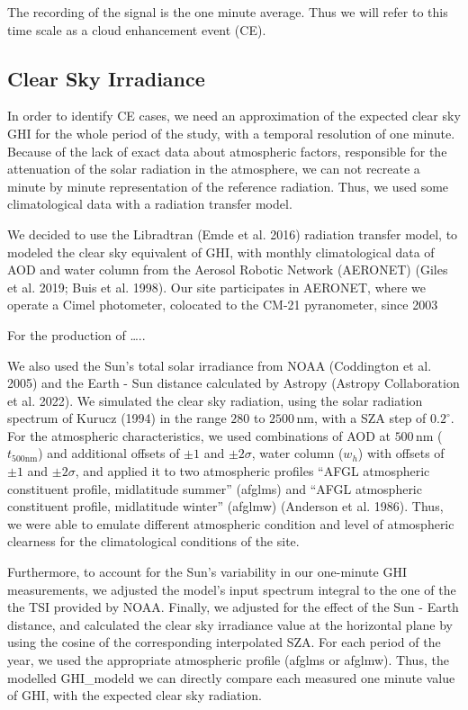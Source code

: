 \documentclass[
]{article}
\begin{document}
The recording of the signal is the one minute average.
Thus we will refer to this time scale as a cloud enhancement event (CE).

\hypertarget{clear-sky-irradiance}{%
\subsection{Clear Sky Irradiance}\label{clear-sky-irradiance}}

In order to identify CE cases, we need an approximation of the expected clear sky GHI
for the whole period of the study, with a temporal resolution of one minute. Because
of the lack of exact data about atmospheric factors, responsible for the attenuation
of the solar radiation in the atmosphere, we can not recreate a minute by minute
representation of the reference radiation. Thus, we used some climatological data
with a radiation transfer model.

We decided to use the Libradtran (Emde et al. 2016) radiation transfer model, to modeled
the clear sky equivalent of GHI, with monthly climatological data of AOD and water
column from the Aerosol Robotic Network (AERONET) (Giles et al. 2019; Buis et al. 1998). Our site
participates in AERONET, where we operate a Cimel photometer, colocated to
the CM-21 pyranometer, since 2003

For the production of \ldots..

We also used the Sun's total solar irradiance from NOAA (Coddington et al. 2005) and the
Earth - Sun distance calculated by Astropy (Astropy Collaboration et al. 2022). We simulated
the clear sky radiation, using the solar radiation spectrum of Kurucz (1994) in the
range \(280\) to \(2500\,\text{nm}\), with a SZA step of \(0.2^\circ\). For the
atmospheric characteristics, we used combinations of AOD at \(500\,\text{nm}\)
(\(t_{500\text{nm}}\)) and additional offsets of \(\pm1\) and \(\pm2\sigma\), water column
(\(w_h\)) with offsets of \(\pm1\) and \(\pm2\sigma\), and applied it to two atmospheric
profiles ``AFGL atmospheric constituent profile, midlatitude summer'' (afglms) and
``AFGL atmospheric constituent profile, midlatitude winter'' (afglmw) (Anderson et al. 1986).
Thus, we were able to emulate different atmospheric condition and level of
atmospheric clearness for the climatological conditions of the site.

Furthermore, to account for the Sun's variability in our one-minute GHI measurements,
we adjusted the model's input spectrum integral to the one of the the TSI provided by
NOAA. Finally, we adjusted for the effect of the Sun - Earth distance, and
calculated the clear sky irradiance value at the horizontal plane by using the cosine
of the corresponding interpolated SZA. For each period of the year, we used the
appropriate atmospheric profile (afglms or afglmw). Thus, the modelled GHI\_modeld we
can directly compare each measured one minute value of GHI, with the expected clear
sky radiation.
\end{document}
